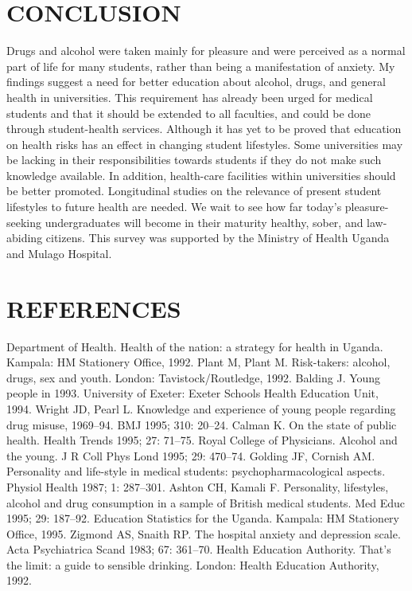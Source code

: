 \documentclass[14pt]{article}
\begin{document}
\section{CONCLUSION}

Drugs and alcohol were taken mainly for pleasure and were perceived as a normal part of life for many students, rather than being a manifestation of anxiety. My findings suggest a need for better education about alcohol, drugs, and general health in universities. This requirement has already been urged for medical students and that it should be extended to all faculties, and could be done through student-health services. Although it has yet to be proved that education on health risks has an effect in changing student lifestyles. Some universities may be lacking in their responsibilities towards students if they do not make such knowledge available. In addition, health-care facilities within universities should be better promoted. Longitudinal studies on the relevance of present student lifestyles to future health are needed. We wait to see how far today’s pleasure-seeking undergraduates will become in their maturity healthy, sober, and law-abiding citizens. This survey was supported by the Ministry of Health Uganda and Mulago Hospital.

\section{REFERENCES}

Department of Health. Health of the nation: a strategy for health in Uganda. Kampala: HM Stationery Office, 1992.
Plant M, Plant M. Risk-takers: alcohol, drugs, sex and youth. London: Tavistock/Routledge, 1992.
Balding J. Young people in 1993. University of Exeter: Exeter Schools Health Education Unit, 1994.
Wright JD, Pearl L. Knowledge and experience of young people regarding drug misuse, 1969–94. BMJ 1995; 310: 20–24.
Calman K. On the state of public health. Health Trends 1995; 27: 71–75.
Royal College of Physicians. Alcohol and the young. J R Coll Phys Lond 1995; 29: 470–74.
Golding JF, Cornish AM. Personality and life-style in medical students: psychopharmacological aspects. Physiol Health 1987; 1: 287–301.
 Ashton CH, Kamali F. Personality, lifestyles, alcohol and drug consumption in a sample of British medical students. Med Educ 1995; 29: 187–92.
Education Statistics for the Uganda. Kampala: HM Stationery Office, 1995.
Zigmond AS, Snaith RP. The hospital anxiety and depression scale. Acta Psychiatrica Scand 1983; 67: 361–70.
Health Education Authority. That’s the limit: a guide to sensible drinking. London: Health Education Authority, 1992.
\end{document}
